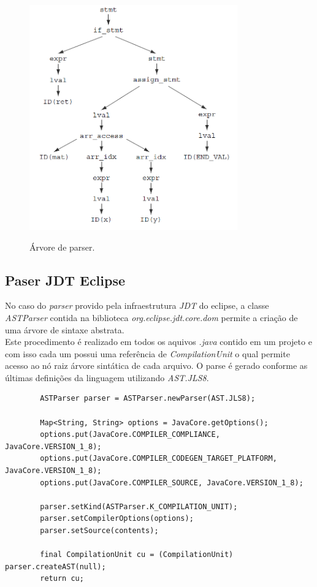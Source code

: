 	\clearpage
	\begin{figure}[h]
		\center
		\includegraphics[width=0.8\textwidth]{Imagens/Arvore}
		\label{fig:TreeParser}
		\caption{Árvore de parser.}
	\end{figure}
	
	
	\subsection{Paser JDT Eclipse}
	No caso do \textit{parser} provido pela infraestrutura \textit{JDT} do eclipse,  a classe \textit{ASTParser} contida na biblioteca \textit{org.eclipse.jdt.core.dom} permite a criação de uma árvore de sintaxe abstrata.\\
	Este procedimento é realizado em todos os aquivos \textit{.java} contido em um projeto e com isso cada um possui uma referência de \textit{CompilationUnit} o qual permite acesso ao nó raiz árvore sintática de cada arquivo. O parse é gerado conforme as últimas definições da linguagem utilizando \textit{AST.JLS8}.\\ 
	\clearpage

	\begin{lstlisting}
		ASTParser parser = ASTParser.newParser(AST.JLS8);
		
		Map<String, String> options = JavaCore.getOptions();
		options.put(JavaCore.COMPILER_COMPLIANCE, JavaCore.VERSION_1_8);
		options.put(JavaCore.COMPILER_CODEGEN_TARGET_PLATFORM, JavaCore.VERSION_1_8);
		options.put(JavaCore.COMPILER_SOURCE, JavaCore.VERSION_1_8);
		
		parser.setKind(ASTParser.K_COMPILATION_UNIT);
		parser.setCompilerOptions(options);
		parser.setSource(contents);
		
		final CompilationUnit cu = (CompilationUnit) parser.createAST(null);
		return cu;
	\end{lstlisting}
	
